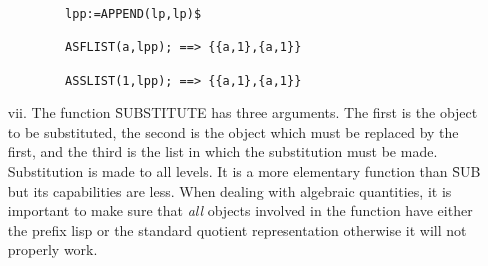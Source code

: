 \begin{itemize}
\begin{verbatim}
        lpp:=APPEND(lp,lp)$

        ASFLIST(a,lpp); ==> {{a,1},{a,1}}

        ASSLIST(1,lpp); ==> {{a,1},{a,1}}

\end{verbatim}
\item[vii.] The function \f{SUBSTITUTE} has three arguments. The first
is the object to be substituted, the second is the object which must be
replaced by the first, and the third is the list in which the substitution 
must be made. Substitution is made to
all levels. It is a more elementary function than \f{SUB} but its
capabilities are less. When dealing with algebraic quantities, it is
important to make sure that {\em all} objects involved in the function
have either the prefix lisp or the standard quotient representation
otherwise it will not properly work.
\end{itemize}

